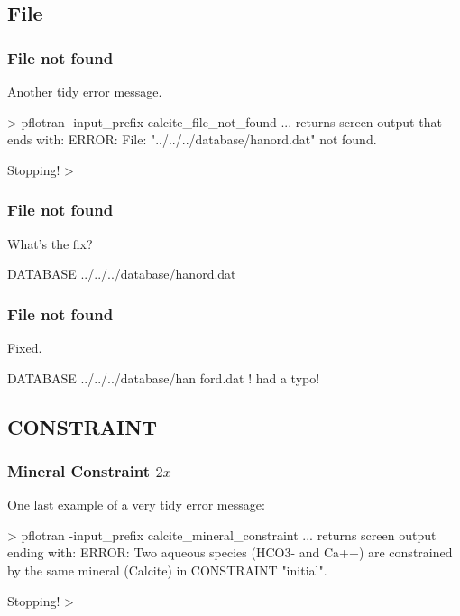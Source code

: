 \documentclass{beamer}
\newcommand\gehcomment[1]{{{\color{orange} #1}}}
\newcommand\redcomment[1]{{{\color{red} #1}}}
\newcommand\bluecomment[1]{{{\color{blue} #1}}}
\newcommand\magentacomment[1]{{{\color{magenta} #1}}}
\begin{document}
\subsection{File}
\begin{frame}\frametitle{File not found}
Another tidy error message.
\begin{semiverbatim}

> pflotran -input_prefix calcite_file_not_found
... \gehcomment{returns screen output that ends with:}
  ERROR: File: "../../../database/hanord.dat" not found.

  Stopping!
>
\end{semiverbatim}

\end{frame}

\begin{frame}\frametitle{File not found}
\redcomment{What's the fix?}
\begin{semiverbatim}
DATABASE ../../../database/hanord.dat
\end{semiverbatim}

\end{frame}

\begin{frame}\frametitle{File not found}
\redcomment{Fixed.}
\begin{semiverbatim}
DATABASE ../../../database/han\magentacomment{f}ord.dat \bluecomment{! had a typo!}
\end{semiverbatim}

\end{frame}

\subsection{CONSTRAINT}

\begin{frame}\frametitle{Mineral Constraint ${2x}$}
One last example of a very tidy error message:
\begin{semiverbatim}

> pflotran -input_prefix calcite_mineral_constraint
... \gehcomment{returns screen output ending with:}
  ERROR: Two aqueous species (HCO3- and Ca++) are
  constrained by the same mineral (Calcite) in
  CONSTRAINT "initial".

  Stopping!
>
\end{semiverbatim}

\end{frame}
\end{document}
